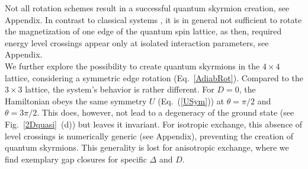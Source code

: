 \documentclass[reprint,aps,prb,superscriptaddress,10pt]{revtex4-2} %
\begin{document}
Not all rotation schemes result in a successful quantum skyrmion creation, see Appendix. 
In contrast to classical systems \cite{Schaffer2020}, it is in general not sufficient to rotate the magnetization of one edge of the quantum spin lattice, as then, required energy level crossings appear only at isolated interaction parameters, see Appendix. \\
We further explore the possibility to create quantum skyrmions in the $4\times4$ lattice, considering a symmetric edge rotation (Eq.~\ref{AdiabRot}). Compared to the $3\times3$ lattice, the system's behavior is rather different. For $D=0$, the Hamiltonian obeys the same symmetry $U$ (Eq.~(\ref{USym})) at $\theta=\pi/2$ and $\theta=3\pi/2$. This does, however, not lead to a degeneracy of the ground state (see Fig.~\ref{2Dquasi}~(d)) but leaves it invariant. For isotropic exchange, this absence of level crossings is numerically generic (see Appendix), preventing the creation of quantum skyrmions. 
This generality is lost for anisotropic exchange,
where we find exemplary gap closures for specific $\Delta$ and $D$. 
\end{document}
